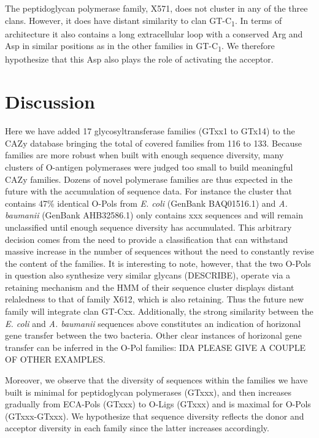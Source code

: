 \documentclass{article}
\begin{document}
The peptidoglycan polymerase family, X571, does not cluster in any of the three clans. However, it does have distant similarity to clan GT-C\textsubscript{1}. In terms of architecture it also contains a long extracellular loop with a conserved Arg and Asp in similar positions as in the other families in GT-C\textsubscript{1}. We therefore hypothesize that this Asp also plays the role of activating the acceptor. 

\section{Discussion}

Here we have added 17 glycosyltransferase families (GTxx1 to GTx14) to the CAZy database bringing the total of covered families from 116 to 133. Because families are more robust when built with enough sequence diversity, many clusters of O-antigen polymerases were judged too small to build meaningful CAZy families. Dozens of novel polymerase families are thus expected in the future with the accumulation of sequence data.  For instance the cluster that contains  47\% identical O-Pols from \textit{E. coli} (GenBank BAQ01516.1) and \textit{A. baumanii} (GenBank AHB32586.1) only contains xxx sequences and will remain unclassified until enough sequence diversity has accumulated. This arbitrary decision comes from the need to provide a classification that can withstand massive increase in the number of sequences without the need to constantly revise the content of the families. It is interesting to note, however, that the two O-Pols in question also synthesize very similar glycans (DESCRIBE), operate via a retaining mechanism and the HMM of their sequence cluster displays distant relaledness to that of family X612, which is also retaining. Thus the future new family will integrate clan GT-Cxx. Additionally, the strong similarity between the \textit{E. coli} and \textit{A. baumanii} sequences above constitutes an indication of horizonal gene transfer between the two bacteria. Other clear instances of horizonal gene transfer can be inferred in the O-Pol families: IDA PLEASE GIVE A COUPLE OF OTHER EXAMPLES.

Moreover, we observe that the diversity of sequences within the families we have built is minimal for peptidoglycan polymerases (GTxxx), and then increases gradually from ECA-Pols (GTxxx) to O-Ligs (GTxxx) and is maximal for O-Pols (GTxxx-GTxxx). We hypothesize that sequence diversity reflects the donor and acceptor diversity in each family since the latter increases accordingly.
\end{document}
